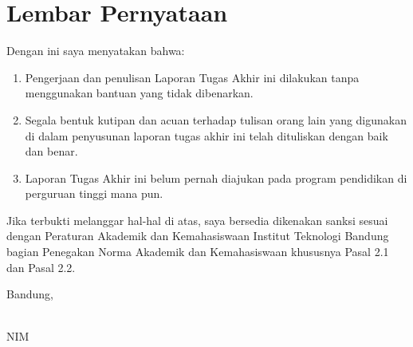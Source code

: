 
\clearpage
\pagestyle{empty}

\chapter*{Lembar Pernyataan}


Dengan ini saya menyatakan bahwa:

\begin{enumerate}[leftmargin=*]
    \item Pengerjaan dan penulisan Laporan Tugas Akhir ini dilakukan tanpa menggunakan bantuan yang tidak dibenarkan.
    \item Segala bentuk kutipan dan acuan terhadap tulisan orang lain yang digunakan di dalam penyusunan laporan tugas akhir ini telah dituliskan dengan baik dan benar.
    \item Laporan Tugas Akhir ini belum pernah diajukan pada program pendidikan di perguruan tinggi mana pun.
\end{enumerate}

Jika terbukti melanggar hal-hal di atas, saya bersedia dikenakan sanksi sesuai dengan Peraturan Akademik dan Kemahasiswaan Institut Teknologi Bandung bagian Penegakan Norma Akademik dan Kemahasiswaan khususnya Pasal 2.1 dan Pasal 2.2.


\vspace{15mm}

Bandung, \tanggal~\bulan~\tahun

\vspace{3cm}
\underline{\penulis} \\
NIM \nim

\clearpage
